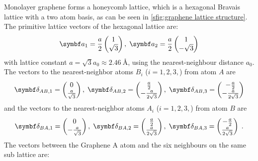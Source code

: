\documentclass[../notes.tex]{subfiles}
\begin{document}
Monolayer graphene forms a honeycomb lattice, which is a hexagonal Bravais lattice with a two atom basis, as can be seen in \cref{sfig:graphene lattice structure}.
The primitive lattice vectors of the hexagonal lattice are:
\begin{align}
	\vb{a}_1 = \frac{a}{2} \begin{pmatrix} 1 \\ \sqrt{3} \end{pmatrix}, \; \vb{a}_2 = \frac{a}{2} \begin{pmatrix} 1 \\ -\sqrt{3} \end{pmatrix}
\end{align}
with lattice constant \(a = \sqrt{3} a_0 \approx \SI{2.46}{\angstrom}\), using the nearest-neighbour distance \(a_0\).
The vectors to the nearest-neighbor atoms \(B_i\) (\(i = 1, 2, 3,\)) from atom \(A\) are
\begin{align}
	\vb{\delta}_{AB, 1} = \begin{pmatrix} 0 \\ \frac{a}{\sqrt{3}} \end{pmatrix},\; \vb{\delta}_{AB, 2} = \begin{pmatrix} \frac{a}{2} \\ -\frac{a}{2\sqrt{3}} \end{pmatrix},\; \vb{\delta}_{AB, 3} = \begin{pmatrix} -\frac{a}{2} \\ -\frac{a}{2\sqrt{3}} \end{pmatrix}
\end{align}
and the vectors to the nearest-neighbor atoms \(A_i\) (\(i = 1, 2, 3,\)) from atom \(B\) are
\begin{align}
	\vb{\delta}_{BA, 1} = \begin{pmatrix} 0 \\ -\frac{a}{\sqrt{3}} \end{pmatrix},\; \vb{\delta}_{BA, 2} = \begin{pmatrix} \frac{a}{2} \\ \frac{a}{2\sqrt{3}} \end{pmatrix},\; \vb{\delta}_{BA, 3} = \begin{pmatrix} -\frac{a}{2} \\ \frac{a}{2\sqrt{3}} \end{pmatrix} \;.
\end{align}
The vectors between the Graphene \(\mathrm{A}\) atom and the six neighbours on the same sub lattice are:
\end{document}
